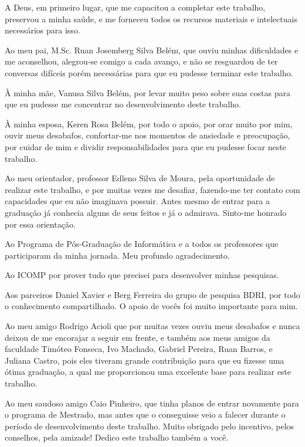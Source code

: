 \documentclass[
	12pt,				%
	openright,			%
	twoside,			%
	a4paper,			%
	english,			%
	spanish,			%
	brazil,				%
	]{abntex2}
\begin{document}
\begin{agradecimentos}

A Deus, em primeiro lugar, que me capacitou a completar este trabalho, preservou a minha saúde, e me forneceu todos os recursos materiais e intelectuais necessários para isso.

Ao meu pai, M.Sc. Ruan Josemberg Silva Belém, que ouviu minhas dificuldades e me aconselhou, alegrou-se comigo a cada avanço, e não se resguardou de ter conversas difíceis porém necessárias para que eu pudesse terminar este trabalho. 

À minha mãe, Vanusa Silva Belém, por levar muito peso sobre suas costas para que eu pudesse me concentrar no desenvolvimento deste trabalho.

À minha esposa, Keren Rosa Belém, por todo o apoio, por orar muito por mim, ouvir meus desabafos, confortar-me nos momentos de ansiedade e preocupação, por cuidar de mim e dividir responsabilidades para que eu pudesse focar neste trabalho. 

Ao meu orientador, professor Edleno Silva de Moura, pela oportunidade de realizar este trabalho, e por muitas vezes me desafiar, fazendo-me ter contato com capacidades que eu não imaginava possuir. Antes mesmo de entrar para a graduação já conhecia alguns de seus feitos e já o admirava. Sinto-me honrado por essa orientação.

Ao Programa de Pós-Graduação de Informática e a todos os professores que participaram da minha jornada. Meu profundo agradecimento.

Ao ICOMP por prover tudo que precisei para desenvolver minhas pesquisas.

Aos parceiros Daniel Xavier e Berg Ferreira do grupo de pesquisa BDRI, por todo o conhecimento compartilhado. O apoio de vocês foi muito importante para mim.

Ao meu amigo Rodrigo Acioli que por muitas vezes ouviu meus desabafos e nunca deixou de me encorajar a seguir em frente, e também aos meus amigos da faculdade Timóteo Fonseca, Ivo Machado, Gabriel Pereira, Ruan Barros, e Juliana Castro, pois eles tiveram grande contribuição para que eu fizesse uma ótima graduação, a qual me proporcionou uma excelente base para realizar este trabalho.

Ao meu saudoso amigo Caio Pinheiro, que tinha planos de entrar novamente para o programa de Mestrado, mas antes que o conseguisse veio a falecer durante o período de desenvolvimento deste trabalho. Muito obrigado pelo incentivo, pelos conselhos, pela amizade! Dedico este trabalho também a você.

\end{agradecimentos}
\end{document}
